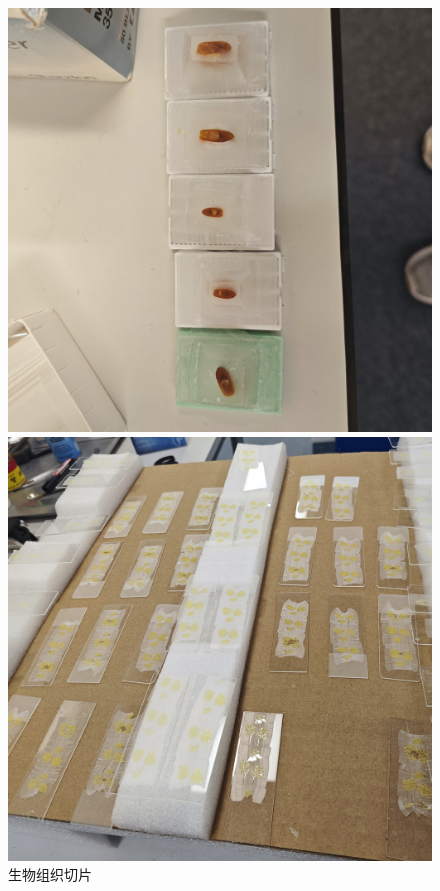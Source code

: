 
\begin{figure}[htbp]
    \centering
    \begin{minipage}{0.3\textwidth}
        \centering
        \includegraphics[width=\textwidth]{./fig/sample.jpg}
        \caption{生物组织切片}
        \label{label:sample}
    \end{minipage}
    \begin{minipage}{0.3\textwidth}
        \centering
        \includegraphics[width=\textwidth]{./fig/采集样本.jpg}

\end{minipage}
\end{figure}
